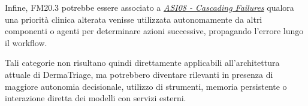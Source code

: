 
Infine, FM20.3 potrebbe essere associato a \href{https://genai.owasp.org/2025/12/09/owasp-top-10-for-agentic-applications-the-benchmark-for-agentic-security-in-the-age-of-autonomous-ai/} {\textit{ASI08 - Cascading Failures}} qualora una priorità clinica alterata venisse utilizzata autonomamente da altri componenti o agenti per determinare azioni successive, propagando l'errore lungo il workflow.


Tali categorie non risultano quindi direttamente applicabili all'architettura attuale di DermaTriage, ma potrebbero diventare rilevanti in presenza di maggiore autonomia decisionale, utilizzo di strumenti, memoria persistente o interazione diretta dei modelli con servizi esterni.